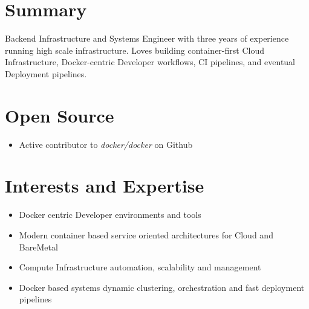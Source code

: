 \documentclass[margin]{res}
\begin{document}

\address{ \textbf{Web}:\hspace{1mm}\href{http://ankush.io/}{ankush.io}\hspace{5mm} \textbf{Github}:\hspace{1mm}\href{https://github.com/ankushagarwal}{ankushagarwal}\hspace{5mm}      \textbf{Email}:\hspace{1mm}\href{mailto:ankushagarwal11@gmail.com}{ankushagarwal11@gmail.com} }

\begin{resume}

\section{Summary}

  Backend Infrastructure and Systems Engineer with three years of experience running high scale infrastructure. Loves building container-first Cloud Infrastructure, Docker-centric Developer workflows, CI pipelines, and eventual Deployment pipelines.

\section{Open Source}
 \begin{itemize} \itemsep -2pt  %
 \item Active contributor to \textit{docker/docker} on Github
 \end{itemize}

\section{Interests and Expertise}
 \begin{itemize} \itemsep -2pt  %
  \item Docker centric Developer environments and tools 
 \item Modern container based service oriented architectures for Cloud and BareMetal
 \item Compute Infrastructure automation, scalability and management
 \item Docker based systems dynamic clustering, orchestration and fast deployment pipelines
 \end{itemize}


\end{resume}
\end{document}
